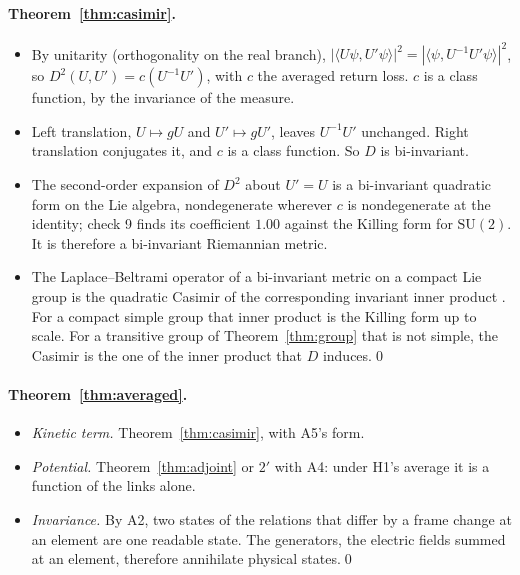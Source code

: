 \documentclass[11pt,a4paper]{article}
\theoremstyle{plain}
\theoremstyle{definition}
\theoremstyle{remark}
\newcommand{\SU}{\mathrm{SU}}
\begin{document}
\paragraph{Theorem~\ref{thm:casimir}.}
\begin{itemize}[leftmargin=2em, itemsep=3pt]
\item By unitarity (orthogonality on the real branch), $|\langle U\psi,U'\psi\rangle|^2=|\langle\psi,U^{-1}U'\psi\rangle|^2$, so $D^2(U,U')=c(U^{-1}U')$, with $c$ the averaged return loss. $c$ is a class function, by the invariance of the measure.
\item Left translation, $U\mapsto gU$ and $U'\mapsto gU'$, leaves $U^{-1}U'$ unchanged. Right translation conjugates it, and $c$ is a class function. So $D$ is bi-invariant.
\item The second-order expansion of $D^2$ about $U'=U$ is a bi-invariant quadratic form on the Lie algebra, nondegenerate wherever $c$ is nondegenerate at the identity; check 9 finds its coefficient $1.00$ against the Killing form for $\SU(2)$. It is therefore a bi-invariant Riemannian metric.
\item The Laplace--Beltrami operator of a bi-invariant metric on a compact Lie group is the quadratic Casimir of the corresponding invariant inner product \cite{helgason}. For a compact simple group that inner product is the Killing form up to scale. For a transitive group of Theorem~\ref{thm:group} that is not simple, the Casimir is the one of the inner product that $D$ induces.\qed
\end{itemize}

\paragraph{Theorem~\ref{thm:averaged}.}
\begin{itemize}[leftmargin=2em, itemsep=3pt]
\item \emph{Kinetic term.} Theorem~\ref{thm:casimir}, with A5's form.
\item \emph{Potential.} Theorem~\ref{thm:adjoint} or $2'$ with A4: under H1's average it is a function of the links alone.
\item \emph{Invariance.} By A2, two states of the relations that differ by a frame change at an element are one readable state. The generators, the electric fields summed at an element, therefore annihilate physical states.\qed
\end{itemize}
\end{document}
